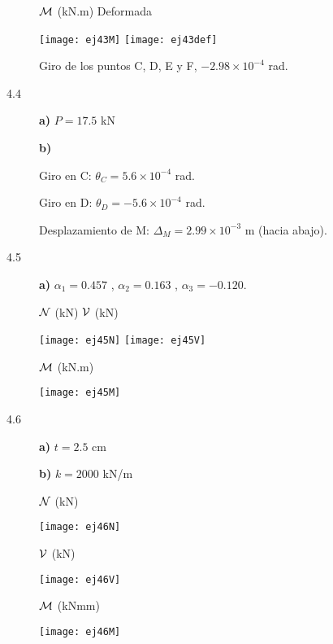 \begin{description}
${\mathcal M}$ (kN.m) \hspace{0.4\textwidth} Deformada
\begin{center}
	\texttt{[image: ej43M]}
	\texttt{[image: ej43def]}
\end{center}


Giro de los puntos C, D, E y F, $-2.98 \times 10^{-4}$ rad.


\item[4.4]

\textbf{a)} $P = 17.5$ kN

\textbf{b)}

Giro en C: $\theta_C = 5.6 \times 10^{-4}$ rad.

Giro en D: $\theta_D = -5.6 \times 10^{-4}$ rad.

Desplazamiento de M: $\Delta_M = 2.99 \times 10^{-3}$ m (hacia abajo).

\item [4.5]
\textbf{a)} $\alpha_1 = 0.457$ , $\alpha_2 = 0.163$ , $\alpha_3 = -0.120$.

${\mathcal N}$ (kN) \hspace{0.4\textwidth} ${\mathcal V}$ (kN)

\begin{center}
	\texttt{[image: ej45N]}
	\texttt{[image: ej45V]}
\end{center}

${\mathcal M}$ (kN.m)

\begin{center}
	\texttt{[image: ej45M]}
\end{center}


\item[4.6]

\textbf{a)} $t = 2.5$ cm

\textbf{b)} $k = 2000$ kN/m


${\mathcal N}$ (kN)
\begin{center}
	\texttt{[image: ej46N]}
\end{center}

${\mathcal V}$ (kN)
\begin{center}
	\texttt{[image: ej46V]}
\end{center}

${\mathcal M}$ (kNmm)

\begin{center}
	\texttt{[image: ej46M]}
\end{center}



\end{description}
